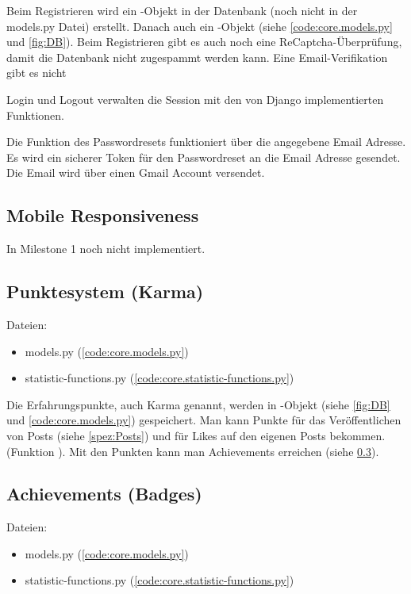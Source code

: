 Beim Registrieren wird ein -Objekt in der Datenbank (noch nicht in der
models.py Datei) erstellt. Danach auch ein -Objekt (siehe
\ref{code:core.models.py} und \ref{fig:DB}). Beim Registrieren gibt es auch noch
eine ReCaptcha-Überprüfung, damit die Datenbank nicht zugespammt werden kann. Eine Email-Verifikation gibt es nicht

Login und Logout verwalten die Session mit den von Django implementierten
Funktionen.

Die Funktion des Passwordresets funktioniert über die angegebene Email Adresse.
Es wird ein sicherer Token für den Passwordreset an die Email Adresse gesendet.
Die Email wird über einen Gmail Account versendet.

\subsection{Mobile Responsiveness} \label{spez:Mobile}

In Milestone 1 noch nicht implementiert.

\subsection{Punktesystem (Karma)} \label{spez:Karma}

Dateien:
\begin{itemize}
    \item models.py (\ref{code:core.models.py})
    \item statistic-functions.py (\ref{code:core.statistic-functions.py})
\end{itemize}

Die Erfahrungspunkte, auch Karma genannt, werden in -Objekt (siehe
\ref{fig:DB} und \ref{code:core.models.py}) gespeichert. Man kann Punkte für das
Veröffentlichen von Posts (siehe \ref{spez:Posts}) und für Likes auf den eigenen
Posts bekommen. (Funktion ). Mit den Punkten kann
man Achievements erreichen (siehe \ref{spez:Badges}).

\subsection{Achievements (Badges)} \label{spez:Badges}

Dateien:
\begin{itemize}
    \item models.py (\ref{code:core.models.py})
    \item statistic-functions.py (\ref{code:core.statistic-functions.py})
\end{itemize}

